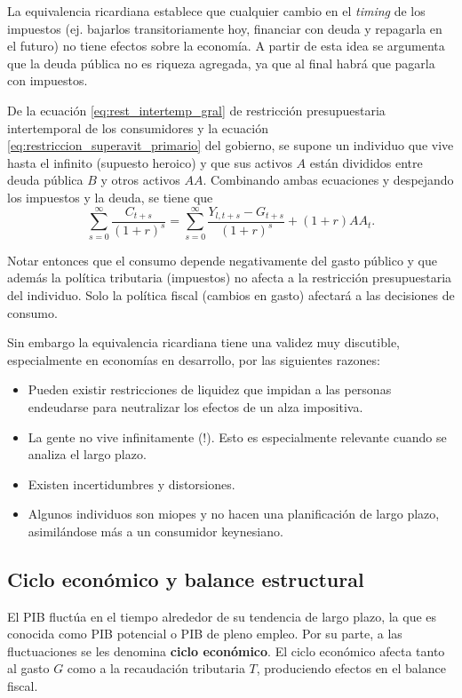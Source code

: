 \documentclass[DeGregorioResumen]{subfiles}
\begin{document}
La equivalencia ricardiana establece que cualquier cambio en el \textit{timing} de los impuestos (ej. bajarlos transitoriamente hoy, financiar con deuda y repagarla en el futuro) no tiene efectos sobre la economía. A partir de esta idea se argumenta que la deuda pública no es riqueza agregada, ya que al final habrá que pagarla con impuestos.

De la ecuación \eqref{eq:rest_intertemp_gral} de restricción presupuestaria intertemporal de los consumidores y la ecuación \eqref{eq:restriccion_superavit_primario} del gobierno, se supone un individuo que vive hasta el infinito (supuesto heroico) y que sus activos $A$ están divididos entre deuda pública $B$ y otros activos $AA$. Combinando ambas ecuaciones y despejando los impuestos y la deuda, se tiene que
\begin{equation}
\sum_{s=0}^{\infty}\frac{C_{t+s}}{(1+r)^s}=\sum_{s=0}^{\infty}\frac{Y_{l,t+s}-G_{t+s}}{(1+r)^s}+(1+r)AA_t.
\end{equation}

Notar entonces que el consumo depende negativamente del gasto público y que además la política tributaria (impuestos) no afecta a la restricción presupuestaria del individuo. Solo la política fiscal (cambios en gasto) afectará a las decisiones de consumo.

Sin embargo la equivalencia ricardiana tiene una validez muy discutible, especialmente en economías en desarrollo, por las siguientes razones:

\begin{itemize}
\item Pueden existir restricciones de liquidez que impidan a las personas endeudarse para neutralizar los efectos de un alza impositiva.
\item La gente no vive infinitamente (!). Esto es especialmente relevante cuando se analiza el largo plazo.
\item Existen incertidumbres y distorsiones.
\item Algunos individuos son miopes y no hacen una planificación de largo plazo, asimilándose más a un consumidor keynesiano.
\end{itemize}

\subsection{Ciclo económico y balance estructural}

El PIB fluctúa en el tiempo alrededor de su tendencia de largo plazo, la que es conocida como PIB potencial o PIB de pleno empleo. Por su parte, a las fluctuaciones se les denomina \textbf{ciclo económico}. El ciclo económico afecta tanto al gasto $G$ como a la recaudación tributaria $T$, produciendo efectos en el balance fiscal.
\end{document}
